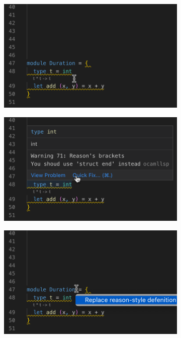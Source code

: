 \begin{figure}[h]
\begin{subfigure}{0.5\textwidth}
	\includegraphics[width=\linewidth]{screenshots/01.png}
\end{subfigure}
\begin{subfigure}{0.5\textwidth}
	\includegraphics[width=\linewidth]{screenshots/02.png}
\end{subfigure}
\newline
\begin{subfigure}{0.5\textwidth}
	\includegraphics[width=\linewidth]{screenshots/03.png}

\end{subfigure}
\end{figure}

